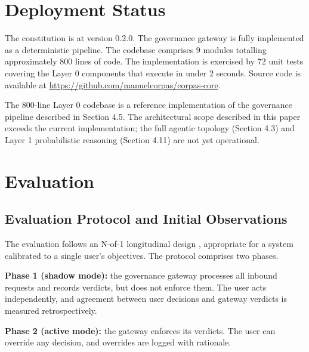 \documentclass[11pt,a4paper]{article}
\begin{document}
\section{Deployment Status}

The constitution is at version 0.2.0. The governance gateway is fully implemented as a deterministic pipeline. The codebase comprises 9 modules totalling approximately 800 lines of code. The implementation is exercised by 72 unit tests covering the Layer 0 components that execute in under 2 seconds. Source code is available at \url{https://github.com/manuelcorpas/corpas-core}.

The 800-line Layer 0 codebase is a reference implementation of the governance pipeline described in Section 4.5. The architectural scope described in this paper exceeds the current implementation; the full agentic topology (Section 4.3) and Layer 1 probabilistic reasoning (Section 4.11) are not yet operational.

\section{Evaluation}

\subsection{Evaluation Protocol and Initial Observations}

The evaluation follows an N-of-1 longitudinal design \citep{lillie2011nof1}, appropriate for a system calibrated to a single user's objectives. The protocol comprises two phases.

\textbf{Phase 1 (shadow mode):} the governance gateway processes all inbound requests and records verdicts, but does not enforce them. The user acts independently, and agreement between user decisions and gateway verdicts is measured retrospectively.

\textbf{Phase 2 (active mode):} the gateway enforces its verdicts. The user can override any decision, and overrides are logged with rationale.
\end{document}
